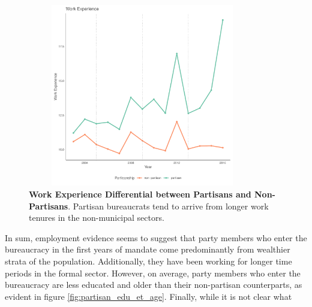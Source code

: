 \documentclass[12pt,a4paper]{article}
\begin{document}
\begin{figure}[H]
    \centering
    \includegraphics[width = 10cm, height = 8cm]{figures/partisanship/plot_work_experience_mean.pdf}
    \caption{\textbf{Work Experience Differential between Partisans and Non-Partisans}. Partisan bureaucrats tend to arrive from longer work tenures in the non-municipal sectors.}
    \label{fig:work_experience}
\end{figure}

In sum, employment evidence seems to suggest that party members who enter the bureaucracy in the first years of mandate come predominantly from wealthier strata of the population. Additionally, they have been working for longer time periods in the formal sector. However, on average, party members who enter the bureaucracy are less educated and older than their non-partisan counterparts, as evident in figure \ref{fig:partisan_edu_et_age}. Finally, while it is not clear what 
\end{document}
